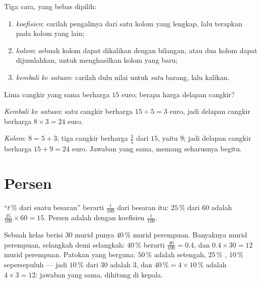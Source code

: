 \begin{method}\label{met:g6:propdata:complete}
Tiga cara, yang bebas dipilih:
\begin{enumerate}
  \item \emph{koefisien}: carilah pengalinya dari satu kolom yang
        lengkap, lalu terapkan pada kolom yang lain;
  \item \emph{kolom}: sebuah kolom dapat dikalikan dengan bilangan,
        atau dua kolom dapat dijumlahkan, untuk menghasilkan kolom
        yang baru;
  \item \emph{kembali ke satuan}: carilah dulu nilai untuk
        \emph{satu} barang, lalu kalikan.
\end{enumerate}
\end{method}

\begin{example}\label{ex:g6:propdata:methods}
Lima cangkir yang sama berharga $15$ euro; berapa harga delapan cangkir?

\emph{Kembali ke satuan}: satu cangkir berharga $15 \div 5 = 3$ euro,
jadi delapan cangkir berharga $8 \times 3 = 24$ euro.

\emph{Kolom}: $8 = 5 + 3$; tiga cangkir berharga $\frac{3}{5}$ dari
$15$, yaitu $9$; jadi delapan cangkir berharga $15 + 9 = 24$ euro.
Jawaban yang sama, memang seharusnya begitu.
\end{example}

\section{Persen}

\begin{definition}[Persen]\label{def:g6:propdata:percent}
``$t\,\%$ dari suatu besaran'' berarti  $\frac{t}{100}$ dari
besaran itu: $25\,\%$ dari $60$ adalah $\frac{25}{100} \times 60 = 15$.
Persen adalah  dengan koefisien $\frac{t}{100}$.
\end{definition}

\begin{example}\label{ex:g6:propdata:percent}
Sebuah kelas berisi $30$ murid punya $40\,\%$ murid perempuan.
Banyaknya murid perempuan, selangkah demi selangkah: $40\,\%$ berarti
$\frac{40}{100} = 0.4$, dan $0.4 \times 30 = 12$ murid perempuan.
Patokan yang berguna: $50\,\%$ adalah setengah, $25\,\%$ ,
$10\,\%$ sepersepuluh --- jadi $10\,\%$ dari $30$ adalah $3$, dan
$40\,\% = 4 \times 10\,\%$ adalah $4 \times 3 = 12$: jawaban yang
sama, dihitung di kepala.
\end{example}

